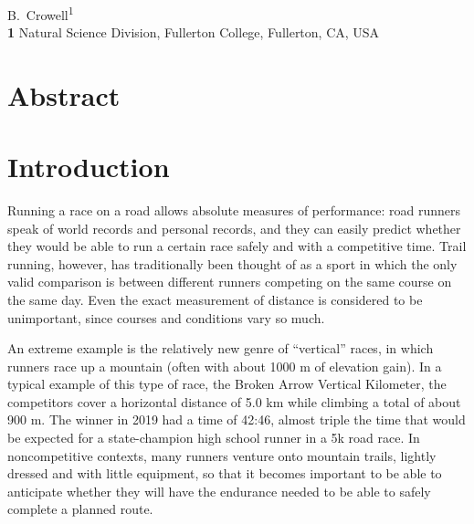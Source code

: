 \documentclass[10pt,letterpaper]{article}
\begin{document}
\vspace*{0.2in}

\begin{flushleft}
{\Large
\textbf{} 
}
\newline
\\
B.~Crowell\textsuperscript{1}
\\
\bigskip
\textbf{1} Natural Science Division, Fullerton College, Fullerton, CA, USA\\
\bigskip

\end{flushleft}
\section*{Abstract}


\linenumbers


\section*{Introduction}
Running a race on a road allows absolute measures of performance:
road runners speak of world records and personal records, and they can
easily predict whether they would be able to run a certain race safely
and with a competitive time. Trail running, however, has traditionally
been thought of as a sport in which the only valid comparison is between
different runners competing on the same course on the same day. Even the
exact measurement of distance is considered to be unimportant, since courses
and conditions vary so much. 

An extreme example is the relatively new genre
of ``vertical'' races, in which runners race up a mountain (often with about
1000 m of elevation gain). In a typical example of this type of race, the Broken
Arrow Vertical Kilometer, the competitors cover a horizontal distance of 5.0 km
while climbing a total of about 900 m. The winner in 2019 had a time of 42:46,
almost triple the time that would be expected for a state-champion high school runner in
a 5k road race. In noncompetitive contexts, many runners venture onto mountain trails,
lightly dressed and with little equipment, so that it becomes important to be able
to anticipate whether they will have the endurance needed to be able to safely complete a planned route.
\end{document}

